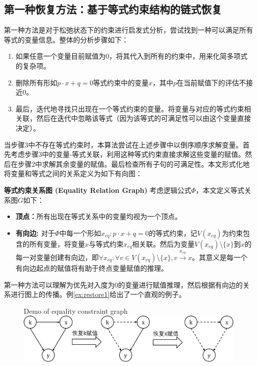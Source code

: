 \subsection{第一种恢复方法：基于等式约束结构的链式恢复}
第一种方法是对于松弛状态下的约束进行启发式分析，尝试找到一种可以满足所有等式的变量信息。整体的分析步骤如下：
\begin{enumerate}
    \item 如果任意一个变量目前赋值为0，将其代入到所有的约束中，用来化简多项式的复杂项。
    \item 删除所有形如$p \cdot x + q = 0$等式约束中的变量$x$，其中$p$在当前赋值下的评估不接近0。
    \item 最后，迭代地寻找只出现在一个等式约束的变量。将变量与对应的等式约束相关联，然后在迭代中忽略该等式（因为该等式的可满足性可以由这个变量直接决定）。
\end{enumerate}
当步骤3中不存在等式约束时，本算法尝试在上述步骤中以倒序顺序求解变量。首先考虑步骤3中的变量-等式关联，利用这种等式约束直接求解这些变量的赋值。然后在步骤2中求解其余变量的赋值。最后检查所有子句的可满足性。本文形式化地将变量和等式之间的关系定义为如下有向图：
\begin{definition}{\textbf{等式约束关系图 (Equality Relation Graph)}}
考虑逻辑公式$\Phi$，本文定义等式关系图$G$如下：
\begin{itemize}
    \item \textbf{顶点：}所有出现在等式关系中的变量均视为一个顶点。
    \item \textbf{有向边:} 对于$\Phi$中每一个形如$x_{eq}: p \cdot x + q = 0$的等式约束，记$V(x_{eq})$为约束包含的所有变量，将变量$x$与等式约束$x_{eq}$相关联。然后为变量$V(x_{eq}) \setminus \{x\}$到$x$的每一对变量创建有向边，即$\forall x_{eq}: \forall v \in V(x_{eq}) \setminus \{x\}, v \xrightarrow{x_{eq}} x$。其意义是每一个有向边起点的赋值将有助于终点变量赋值的推理。
\end{itemize}
\end{definition}

第一种方法可以理解为优先对入度为0的变量进行赋值推理，然后根据有向边的关系进行图上的传播。例\ref{ex:restore1}给出了一个直观的例子。

\begin{figure}[t]
    \centering
     {Demo of equality constraint graph}
    \includegraphics[width=\columnwidth]{Img/restore1.png}
\label{fig:restore1}
\end{figure}


